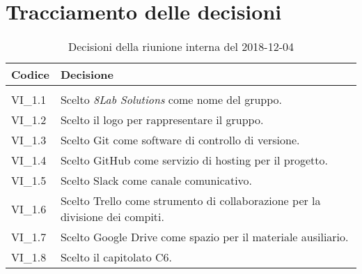\section{Tracciamento delle decisioni}

	
	\begin{longtable}{ >{\centering}p{} >{}p{}}
		
		\rowcolorhead
		\textbf{\color{white}Codice} 
		& \centering\textbf{\color{white}Decisione} 
		\tabularnewline 
		\endfirsthead
		
		\caption{Decisioni della riunione interna del 2018-12-04}\\	
		
		VI\_1.1 & Scelto \textit{8Lab Solutions} come nome del gruppo.
		
		\tabularnewline 
		VI\_1.2 & Scelto il logo per rappresentare il gruppo.
		
		\tabularnewline 
		VI\_1.3 & Scelto Git come software di controllo di versione.
	
		\tabularnewline 
		VI\_1.4 & Scelto GitHub come servizio di hosting per il progetto.
		
		\tabularnewline 
		VI\_1.5 & Scelto Slack come canale comunicativo.
		
		\tabularnewline 
		VI\_1.6 & Scelto Trello come strumento di collaborazione per la 
		divisione 
				dei compiti.
	
		\tabularnewline 
		VI\_1.7 & Scelto Google Drive come spazio per il materiale ausiliario.
		
		\tabularnewline
		VI\_1.8 & Scelto il capitolato C6.	
	
	\end{longtable}
	
